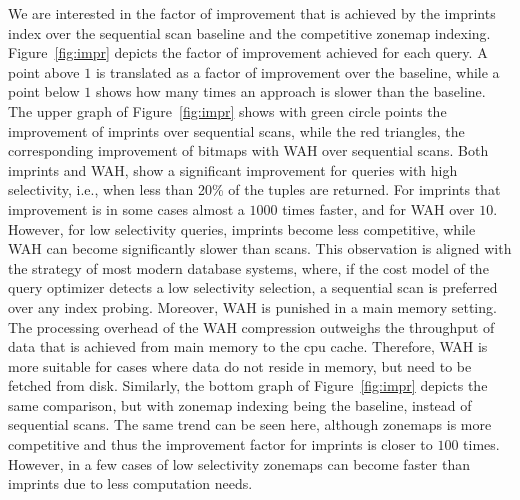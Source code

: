 We are interested in the factor of improvement that is achieved by
the imprints index over the sequential scan baseline and the competitive
zonemap indexing. Figure~\ref{fig:impr} depicts the factor of improvement
achieved for each query. A point above $1$ is translated as a factor of
improvement over the baseline, while a point below $1$ shows how many times
an approach is slower than the baseline. The upper graph of
Figure~\ref{fig:impr} shows with green circle points the improvement of
imprints over sequential scans, while the red triangles, the corresponding
improvement of bitmaps with WAH over sequential scans. Both imprints and WAH,
show a significant improvement for queries with high selectivity, i.e., when
less than 20\% of the tuples are returned. For imprints that improvement is in
some cases almost a $1000$ times faster, and for WAH over $10$. However, for
low selectivity queries, imprints become less competitive, while WAH can become
significantly slower than scans. This observation is aligned with the strategy
of most modern database systems, where, if the cost model of the query
optimizer detects a low selectivity selection, a sequential scan is preferred
over any index probing. Moreover, WAH is punished in a main memory setting. The
processing overhead of the WAH compression outweighs the throughput of data
that is achieved from main memory to the cpu cache. Therefore, WAH is more
suitable for cases where data do not reside in memory, but need to be fetched
from disk. Similarly, the bottom graph of Figure~\ref{fig:impr} depicts the
same comparison, but with zonemap indexing being the baseline, instead of
sequential scans. The same trend can be seen here, although zonemaps is more
competitive and thus the improvement factor for imprints is closer to $100$
times. However, in a few cases of low selectivity zonemaps can become faster
than imprints due to less computation needs.

